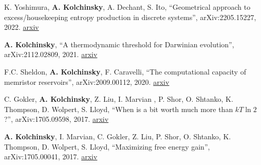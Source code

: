 
K. Yoshimura, \textbf{A. Kolchinsky}, A. Dechant, S. Ito, 
``Geometrical approach to excess/housekeeping entropy production in discrete systems'', arXiv:2205.15227, 2022. \href{https://arxiv.org/abs/2205.15227}{arxiv}

\textbf{A. Kolchinsky}, ``A thermodynamic threshold for Darwinian evolution'', arXiv:2112.02809, 2021. \href{http://arxiv.org/abs/2112.02809}{arxiv} 

F.C. Sheldon, \textbf{A. Kolchinsky}, F. Caravelli, ``The computational capacity of memristor reservoirs'', arXiv:2009.00112, 2020. \href{http://arxiv.org/abs/2009.00112}{arxiv}

C. Gokler, \textbf{A. Kolchinsky}, Z. Liu, I. Marvian , P. Shor, O. Shtanko, K. Thompson, D. Wolpert, S. Lloyd, ``When is a bit worth much more than $kT \ln 2$?'', arXiv:1705.09598, 2017. \href{https://arxiv.org/abs/1705.09598}{arxiv}

\textbf{A. Kolchinsky}, I. Marvian, C. Gokler, Z. Liu, P. Shor, O. Shtanko, K. Thompson, D. Wolpert, S. Lloyd, ``Maximizing free energy gain'', arXiv:1705.00041, 2017. \href{https://arxiv.org/abs/1705.00041}{arxiv}


